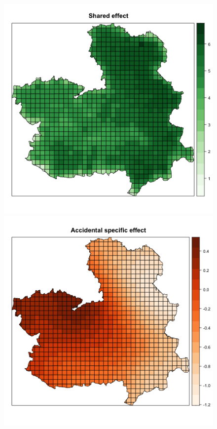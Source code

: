\begin{figure}[h!]
\begin{center}
\includegraphics[scale=0.40]{images/CLMFires_shared.png}
\includegraphics[scale=0.40]{images/CLMFires_acc_specific.png}

\end{center}
\end{figure}
